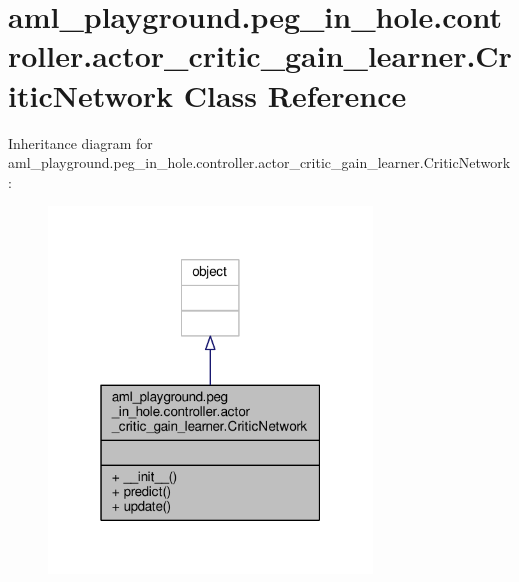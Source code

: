 \hypertarget{classaml__playground_1_1peg__in__hole_1_1controller_1_1actor__critic__gain__learner_1_1_critic_network}{\section{aml\-\_\-playground.\-peg\-\_\-in\-\_\-hole.\-controller.\-actor\-\_\-critic\-\_\-gain\-\_\-learner.\-Critic\-Network Class Reference}
\label{classaml__playground_1_1peg__in__hole_1_1controller_1_1actor__critic__gain__learner_1_1_critic_network}
}


Inheritance diagram for aml\-\_\-playground.\-peg\-\_\-in\-\_\-hole.\-controller.\-actor\-\_\-critic\-\_\-gain\-\_\-learner.\-Critic\-Network\-:
\nopagebreak
\begin{figure}[H]
\begin{center}
\leavevmode
\includegraphics[width=244pt]{classaml__playground_1_1peg__in__hole_1_1controller_1_1actor__critic__gain__learner_1_1_critic_network__inherit__graph}
\end{center}
\end{figure}


